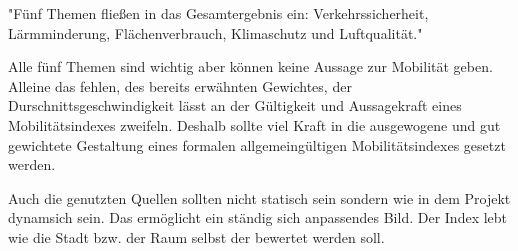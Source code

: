 


"Fünf Themen fließen in das Gesamtergebnis ein: Verkehrssicherheit, Lärmminderung, Flächenverbrauch, Klimaschutz und Luftqualität."


Alle fünf Themen sind wichtig aber können keine Aussage zur Mobilität geben. Alleine das fehlen, des bereits erwähnten Gewichtes, der Durschnittsgeschwindigkeit lässt an der Gültigkeit und Aussagekraft eines Mobilitätsindexes zweifeln.
Deshalb sollte viel Kraft in die ausgewogene und gut gewichtete Gestaltung eines formalen allgemeingültigen Mobilitätsindexes gesetzt werden.

Auch die genutzten Quellen sollten nicht statisch sein sondern wie in dem Projekt dynamsich sein. Das ermöglicht ein ständig sich anpassendes Bild. Der Index lebt wie die Stadt bzw. der Raum selbst der bewertet werden soll.
